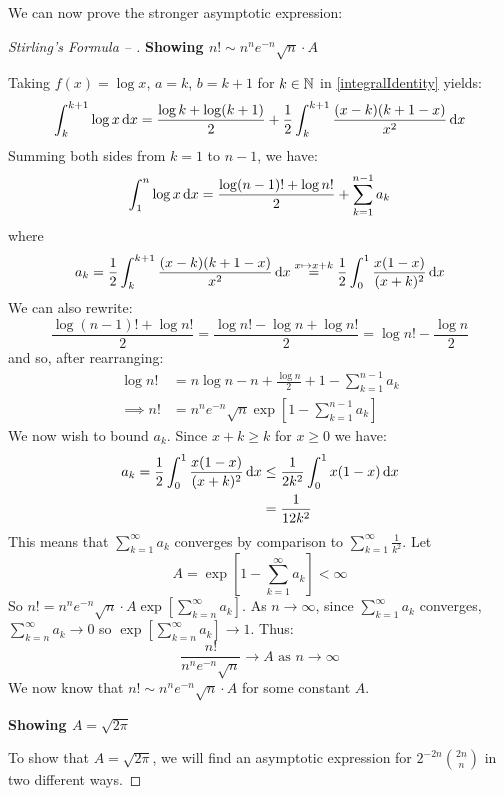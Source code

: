 \documentclass[../main.tex]{subfiles}
\begin{document}
We can now prove the stronger asymptotic expression:
\begin{proof}[Stirling's Formula -- ]\par
  \textbf{Showing $n! \sim n^n e^{-n}\sqrt{n} \cdot A$}\par
  Taking $f(x) = \log x$, $a = k$, $b = k + 1$ for $k \in \mathbb{N}$ in \cref{integralIdentity} yields:
  \[
    \int_{k}^{k + 1} \log x \d{x} = \frac{\log k + \log(k + 1)}{2} + \frac{1}{2}\int_{k}^{k + 1} \frac{(x - k)(k + 1 - x)}{x^2} \d{x}
  \]
  Summing both sides from $k = 1$ to $n - 1$, we have:
  \[
    \int_{1}^{n} \log x \d{x} = \frac{\log (n - 1)! + \log n!}{2} + \sum_{k = 1}^{n - 1} a_k
  \]
  where
  \[
    a_k = \frac{1}{2} \int_{k}^{k + 1} \frac{(x - k)(k + 1 - x)}{x^2} \d{x} \stackrel{x \mapsto x + k}= \frac{1}{2} \int_{0}^{1} \frac{x(1 - x)}{(x + k)^2} \d{x}
  \]
  We can also rewrite:
  \[
    \frac{\log (n - 1)! + \log n!}{2} = \frac{\log n! - \log n + \log n!}{2} = \log n! - \frac{\log n}{2}
  \]
  and so, after rearranging:
  \begin{align*}
    \log n! &= n \log n - n + \frac{\log n}{2} + 1 - \sum_{k = 1}^{n - 1} a_k \\
    \implies n! &= n^n e^{-n} \sqrt{n} \exp\left[1 - \sum_{k = 1}^{n - 1} a_k\right]
  \end{align*}
  We now wish to bound $a_k$.
  Since $x + k \geq k$ for $x \geq 0$ we have:
  \begin{align*}
    a_k = \frac{1}{2} \int_{0}^{1} \frac{x(1 - x)}{(x + k)^2} \d{x} &\leq \frac{1}{2k^2} \int_{0}^{1} x(1 - x) \d{x} \\
                                                                    &= \frac{1}{12k^2}
  \end{align*}
  This means that $\sum_{k = 1}^{\infty} a_k$ converges by comparison to $\sum_{k = 1}^{\infty} \frac{1}{k^2}$.
  Let
  \[
    A = \exp\left[1 - \sum_{k = 1}^{\infty} a_k\right] < \infty
  \]
  So $n! = n^n e^{-n} \sqrt{n} \cdot A \exp\left[\sum_{k = n}^{\infty} a_k\right]$.
  As $n \to \infty$, since $\sum_{k = 1}^{\infty} a_k$ converges, $\sum_{k = n}^{\infty} a_k \to 0$ so $\exp\left[\sum_{k = n}^{\infty} a_k\right] \to 1$.
  Thus:
  \[
    \frac{n!}{n^{n}e^{-n}\sqrt{n}} \to A \text{ as $n \to \infty$}
  \]
  We now know that $n! \sim n^n e^{-n}\sqrt{n} \cdot A$ for some constant $A$.

  \textbf{Showing $A = \sqrt{2 \pi}$}\par
  To show that $A = \sqrt{2 \pi}$, we will find an asymptotic expression for $2^{-2n} \binom{2n}{n}$ in two different ways.


\end{proof}
\end{document}
